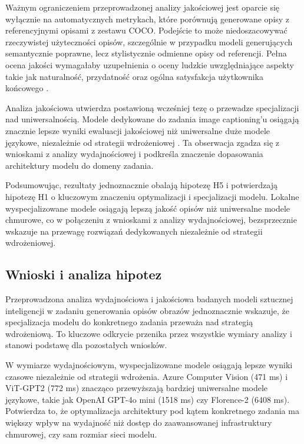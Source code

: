 Ważnym ograniczeniem przeprowadzonej analizy jakościowej jest oparcie się wyłącznie na automatycznych metrykach,
które porównują generowane opisy z referencyjnymi opisami z zestawu COCO. Podejście to może niedoszacowywać
rzeczywistej użyteczności opisów, szczególnie w przypadku modeli generujących semantycznie poprawne, lecz stylistycznie
odmienne opisy od referencji. Pełna ocena jakości wymagałaby uzupełnienia o oceny ludzkie uwzględniające aspekty
takie jak naturalność, przydatność oraz ogólna satysfakcja użytkownika końcowego \cite{human_evaluation_necessity_belz2009}.

Analiza jakościowa utwierdza postawioną wcześniej tezę o przewadze specjalizacji nad uniwersalnością. Modele dedykowane
do zadania image captioning'u osiągają znacznie lepsze wyniki ewaluacji jakościowej niż uniwersalne duże modele językowe,
niezależnie od strategii wdrożeniowej \cite{domain_adaptation_pan2009}. Ta obserwacja zgadza się z wnioskami z analizy wydajnościowej i podkreśla
znaczenie dopasowania architektury modelu do domeny zadania.

Podsumowując, rezultaty jednoznacznie obalają hipotezę H5 i potwierdzają hipotezę H1 o kluczowym znaczeniu optymalizacji i
specjalizacji modelu. Lokalne wyspecjalizowane modele osiągają lepszą jakość opisów niż uniwersalne modele chmurowe,
co w połączeniu z wnioskami z analizy wydajnościowej, bezsprzecznie wskazuje na przewagę rozwiązań dedykowanych
niezależnie od strategii wdrożeniowej.

\subsection{Wnioski i analiza hipotez}\label{ss:wnioski_i_analiza_hipotez}

\noindent
Przeprowadzona analiza wydajnościowa i jakościowa badanych modeli sztucznej inteligencji w zadaniu generowania opisów obrazów
jednoznacznie wskazuje, że specjalizacja modelu
do konkretnego zadania przeważa nad strategią wdrożeniową. To kluczowe odkrycie przenika przez wszystkie wymiary analizy i stanowi podstawę dla pozostałych wniosków.

W wymiarze wydajnościowym, wyspecjalizowane modele osiągają lepsze wyniki czasowe niezależnie od strategii wdrożenia.
Azure Computer Vision (471 ms) i ViT-GPT2 (772 ms) znacząco przewyższają bardziej uniwersalne modele językowe, 
takie jak OpenAI GPT-4o mini (1518 ms) czy Florence-2 (6408 ms). Potwierdza to, że optymalizacja architektury
pod kątem konkretnego zadania ma większy wpływ na wydajność niż dostęp do zaawansowanej infrastruktury chmurowej,
czy sam rozmiar sieci modelu.

